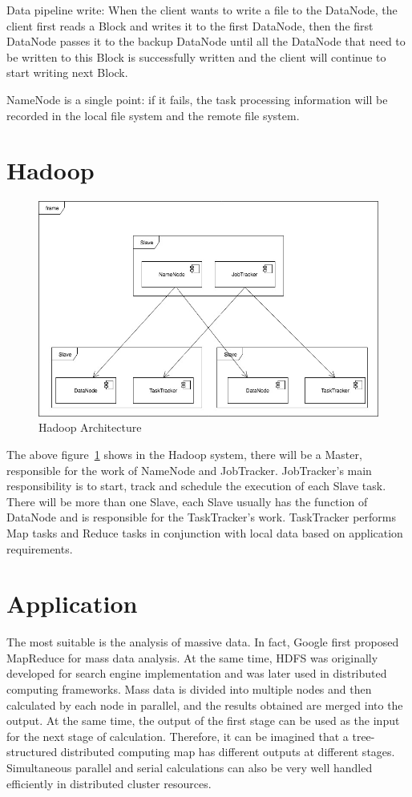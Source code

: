 Data pipeline write: When the client wants to write a file to the DataNode, the client first reads a Block and writes it to the first DataNode, then the first DataNode passes it to the backup DataNode until all the DataNode that need to be written to this Block is successfully written and the client will continue to start writing next Block.


NameNode is a single point: if it fails, the task processing information will be recorded in the local file system and the remote file system.

\section{Hadoop}
\begin{figure}[!ht]
  \centering\includegraphics[width=\columnwidth]{images/hadoop.jpg}
  \caption{Hadoop Architecture }\label{f:hadoop}
\end{figure}


The above figure~\ref{f:hadoop} shows in the Hadoop system, there will be a Master, responsible for the work of NameNode and JobTracker. JobTracker's main responsibility is to start, track and schedule the execution of each Slave task. There will be more than one Slave, each Slave usually has the function of DataNode and is responsible for the TaskTracker's work. TaskTracker performs Map tasks and Reduce tasks in conjunction with local data based on application requirements.

\section{Application}
The most suitable is the analysis of massive data. In fact, Google first proposed MapReduce for mass data analysis. At the same time, HDFS was originally developed for search engine implementation and was later used in distributed computing frameworks. Mass data is divided into multiple nodes and then calculated by each node in parallel, and the results obtained are merged into the output. At the same time, the output of the first stage can be used as the input for the next stage of calculation. Therefore, it can be imagined that a tree-structured distributed computing map has different outputs at different stages. Simultaneous parallel and serial calculations can also be very well handled efficiently in distributed cluster resources.

